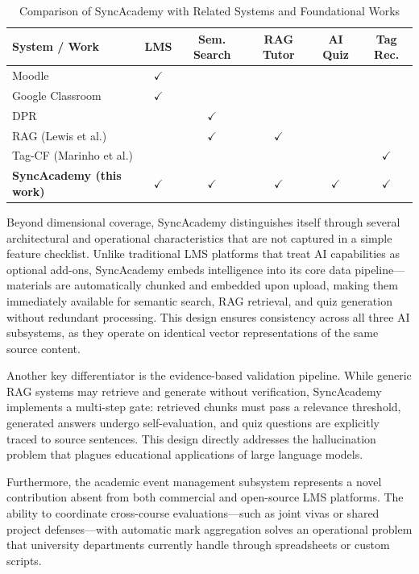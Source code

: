 \documentclass[12pt,a4paper]{report}
\begin{document}
\begin{table}[htbp]
\caption{Comparison of SyncAcademy with Related Systems and Foundational Works}
\label{tab:related}
\centering
\small
\begin{tabularx}{\textwidth}{|X|c|c|c|c|c|}
\hline
\textbf{System / Work} & \textbf{LMS} & \textbf{Sem. Search} & \textbf{RAG Tutor} & \textbf{AI Quiz} & \textbf{Tag Rec.}\\
\hline
Moodle \cite{moodle} & $\checkmark$ & & & & \\
Google Classroom & $\checkmark$ & & & & \\
DPR \cite{dpr} & & $\checkmark$ & & & \\
RAG (Lewis et al.) \cite{rag} & & $\checkmark$ & $\checkmark$ & & \\
Tag-CF (Marinho et al.) \cite{tagging} & & & & & $\checkmark$ \\
\textbf{SyncAcademy (this work)} & $\checkmark$ & $\checkmark$ & $\checkmark$ & $\checkmark$ & $\checkmark$ \\
\hline
\end{tabularx}
\end{table}

Beyond dimensional coverage, SyncAcademy distinguishes itself through several architectural and operational characteristics that are not captured in a simple feature checklist. Unlike traditional LMS platforms that treat AI capabilities as optional add-ons, SyncAcademy embeds intelligence into its core data pipeline—materials are automatically chunked and embedded upon upload, making them immediately available for semantic search, RAG retrieval, and quiz generation without redundant processing. This design ensures consistency across all three AI subsystems, as they operate on identical vector representations of the same source content.

Another key differentiator is the evidence-based validation pipeline. While generic RAG systems may retrieve and generate without verification, SyncAcademy implements a multi-step gate: retrieved chunks must pass a relevance threshold, generated answers undergo self-evaluation, and quiz questions are explicitly traced to source sentences. This design directly addresses the hallucination problem that plagues educational applications of large language models.

Furthermore, the academic event management subsystem represents a novel contribution absent from both commercial and open-source LMS platforms. The ability to coordinate cross-course evaluations—such as joint vivas or shared project defenses—with automatic mark aggregation solves an operational problem that university departments currently handle through spreadsheets or custom scripts.
\end{document}
